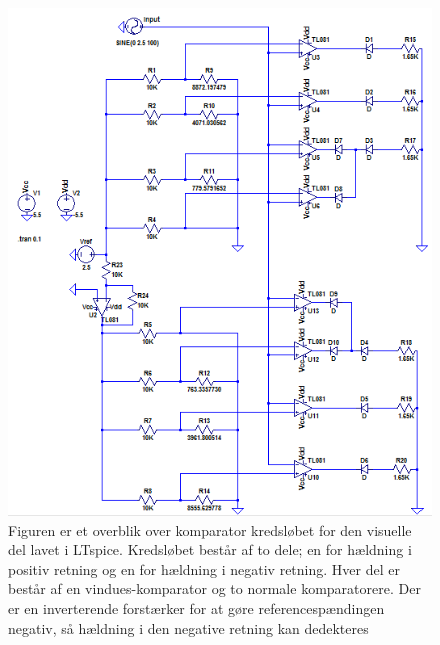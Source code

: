 \begin{figure}[H]
	\centering
	\includegraphics[scale=1.0]{figures/cProblemloesning/komparator_visuel.PNG}
	\caption{Figuren er et overblik over komparator kredsløbet for den visuelle del lavet i LTspice. Kredsløbet består af to dele; en for hældning i positiv retning og en for hældning i negativ retning. Hver del er består af en vindues-komparator og to normale komparatorere. Der er en inverterende forstærker for at gøre referencespændingen negativ, så hældning i den negative retning kan dedekteres}
	\label{fig:komparator_visuel}
\end{figure}


